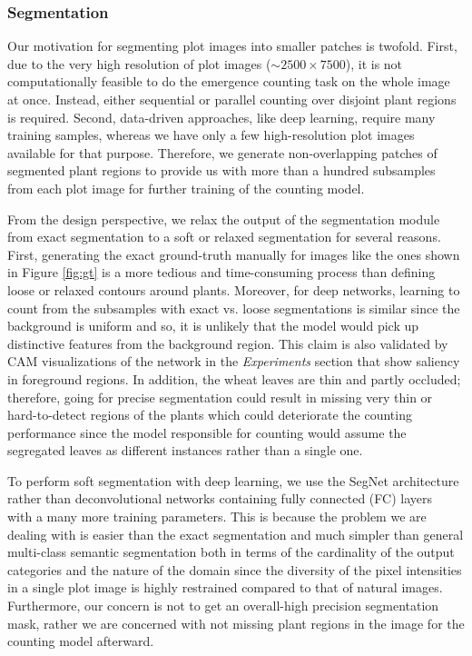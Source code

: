 \documentclass[10pt,twocolumn,letterpaper]{article}
\begin{document}
\subsubsection{Segmentation}

Our motivation for segmenting plot images into smaller patches is twofold. First, due to the very high resolution of plot images ($\sim2500\times7500$), it is not computationally feasible to do the emergence counting task on the whole image at once. Instead, either sequential or parallel counting over disjoint plant regions is required. Second, data-driven approaches, like deep learning, require many training samples, whereas we have only a few high-resolution plot images available for that purpose. Therefore, we generate non-overlapping patches of segmented plant regions to provide us with more than a hundred subsamples from each plot image for further training of the counting model.

From the design perspective, we relax the output of the segmentation module from exact segmentation to a soft or relaxed segmentation for several reasons. First, generating the exact ground-truth manually for images like the ones shown in Figure \ref{fig:gt} is a more tedious and time-consuming process than defining loose or relaxed contours around plants. Moreover, for deep networks, learning to count from the subsamples with exact vs. loose segmentations is similar since the background is uniform and so, it is unlikely that the model would pick up distinctive features from the background region. This claim is also validated by CAM \cite{cam-mit} visualizations of the network in the \textit{Experiments} section that show saliency in foreground regions. In addition, the wheat leaves are thin and partly occluded; therefore, going for precise segmentation could result in missing very thin or hard-to-detect regions of the plants which could deteriorate the counting performance since the model responsible for counting would assume the segregated leaves as different instances rather than a single one.

To perform soft segmentation with deep learning, we use the SegNet architecture \cite{segnet, aich-cvppp2017} rather than deconvolutional networks containing fully connected (FC) layers~\cite{deconvnet} with a many more training parameters. This is because %
 the problem we are dealing with is easier than the exact segmentation and much simpler than general multi-class semantic segmentation both in terms of the cardinality of the output categories and the nature of the domain since the diversity of the pixel intensities in a single plot image is highly restrained compared to that of natural images. Furthermore, our concern is not to get an overall-high precision segmentation mask, rather we are concerned with not missing plant regions in the image for the counting model afterward.
\end{document}
